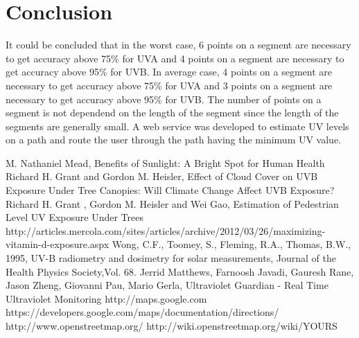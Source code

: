 \documentclass[10pt]{sigplan-proc-varsize}
\begin{document}
\section{Conclusion}
It could be concluded that in the worst case, 6 points on a segment are necessary to get accuracy above 75\% for UVA and 4 points on a segment are necessary to get accuracy above 95\% for UVB. In average case, 4 points on a segment are necessary to get accuracy above 75\% for UVA and  3 points on a segment are necessary to get accuracy above 95\% for UVB. The number of points on a segment is not dependend on the length of the segment since the length of the segments are generally small. A web service was developed to estimate UV levels on a path and route the user through the path having the minimum UV value.\\

\begin{thebibliography}{10}
 M. Nathaniel Mead, Benefits of Sunlight: A Bright Spot for Human Health
 Richard H. Grant and Gordon M. Heisler, Effect of Cloud Cover on UVB Exposure Under Tree Canopies: Will Climate Change Affect UVB Exposure? 
Richard H. Grant , Gordon M. Heisler and Wei Gao, Estimation of Pedestrian Level UV Exposure Under Trees
 http://articles.mercola.com/sites/articles/archive/2012/03/26/maximizing-vitamin-d-exposure.aspx
 Wong, C.F., Toomey, S., Fleming, R.A., Thomas, B.W., 1995, UV-B radiometry and dosimetry for solar measurements, Journal of the Health Physics Society,Vol. 68.
Jerrid Matthews, Farnoosh Javadi, Gauresh Rane, Jason Zheng, Giovanni Pau, Mario Gerla, Ultraviolet Guardian - Real Time Ultraviolet Monitoring
 http://maps.google.com
https://developers.google.com/maps/documentation/directions/
http://www.openstreetmap.org/
http://wiki.openstreetmap.org/wiki/YOURS

\end{thebibliography}
\end{document}
